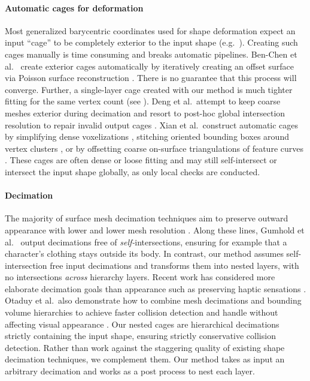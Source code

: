 \paragraph{Automatic cages for deformation}
%
Most generalized barycentric coordinates used for shape deformation expect an
input ``cage'' to be completely exterior to the input shape (e.g.\
\cite{Ju:2005:MVC,HarmonicCoodinates07}).
%
Creating such cages manually is time consuming and breaks automatic pipelines.
%
Ben-Chen et al.\  create exterior cages
automatically by iteratively creating an offset surface via Poisson surface
reconstruction \cite{PoissonSurfaceReconstruction06}. There is no guarantee
that this process will converge. Further, a single-layer cage created with our
method is much tighter fitting for the same vertex count (see
).
%
Deng et al.\ attempt to keep coarse meshes exterior during decimation and
resort to post-hoc global intersection resolution to repair invalid output
cages \shortcite{Deng:2011vr}.
%
Xian et al.\ construct automatic cages by simplifying dense voxelizations
\shortcite{Xian:2009}, stitching oriented bounding boxes
around vertex clusters , or by offsetting coarse
on-surface triangulations of feature curves \shortcite{Xian:2013}.
%
These cages are often dense or loose fitting and may still self-intersect or
intersect the input shape globally, as only local checks are conducted.



\paragraph{Decimation}
%
The majority of surface mesh decimation techniques aim to preserve outward
appearance with lower and lower mesh resolution
\cite{Hoppe:1996:PM,Garland:1997:SSU,Melax98}.
%
Along these lines, Gumhold et al.\  output
decimations free of \emph{self-}intersections, ensuring for example that a
character's clothing stays outside its body.
%
In contrast, our method assumes self-intersection free input decimations and
transforms them into nested layers, with no intersections \emph{across}
hierarchy layers.
%
Recent work has considered more elaborate decimation goals than appearance such
as preserving haptic sensations \cite{Otaduy:2003:SPS}.
%
Otaduy et al.\ also demonstrate how to combine mesh decimations and bounding
volume hierarchies to achieve faster collision detection and handle without
affecting visual appearance \shortcite{Otaduy:2003:CDH}.
%
Our nested cages are hierarchical decimations strictly containing the input
shape, ensuring strictly conservative collision detection.
%
Rather than work against the staggering quality of existing shape decimation
techniques, we complement them. Our method takes as input an arbitrary
decimation and works as a post process to nest each layer.

